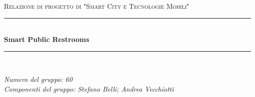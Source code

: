 \documentclass[12pt]{article}
\begin{document}

\begin{titlepage}

\newcommand{\HRule}{\rule{\linewidth}{0.5mm}}

\center

\textsc{\Large Relazione di progetto di "Smart City e Tecnologie Mobili"}\\[0.5cm]

\HRule \\[0.4cm]
{ \huge \bfseries Smart Public Restrooms }\\[0.4cm]
\HRule \\[1.5cm]

\vfill

\begin{flushleft}
\emph{Numero del gruppo: 60}\\[1cm]
\emph{Componenti del gruppo: \textit{Stefano Belli}; \textit{Andrea Vecchiotti}}\\[3cm]
\end{flushleft}



\end{titlepage}


\tableofcontents

\newpage

\end{document}
